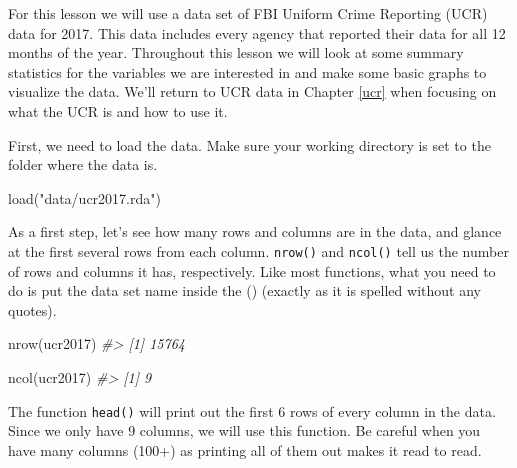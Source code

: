 \documentclass[
  12pt,
]{book}
\newenvironment{Shaded}{\begin{snugshade}}{\end{snugshade}}
\newcommand{\CommentTok}[1]{\textcolor[rgb]{0.37,0.37,0.37}{\textit{#1}}}
\newcommand{\FunctionTok}[1]{\textcolor[rgb]{0,0,0}{#1}}
\newcommand{\NormalTok}[1]{#1}
\newcommand{\StringTok}[1]{\textcolor[rgb]{0.5,0.5,0.5}{#1}}
\begin{document}
For this lesson we will use a data set of FBI Uniform Crime Reporting (UCR) data for 2017. This data includes every agency that reported their data for all 12 months of the year. Throughout this lesson we will look at some summary statistics for the variables we are interested in and make some basic graphs to visualize the data. We'll return to UCR data in Chapter \ref{ucr} when focusing on what the UCR is and how to use it.

First, we need to load the data. Make sure your working directory is set to the folder where the data is.

\begin{Shaded}
\begin{Highlighting}[]
\FunctionTok{load}\NormalTok{(}\StringTok{"data/ucr2017.rda"}\NormalTok{)}
\end{Highlighting}
\end{Shaded}

As a first step, let's see how many rows and columns are in the data, and glance at the first several rows from each column. \texttt{nrow()} and \texttt{ncol()} tell us the number of rows and columns it has, respectively. Like most functions, what you need to do is put the data set name inside the () (exactly as it is spelled without any quotes).

\begin{Shaded}
\begin{Highlighting}[]
\FunctionTok{nrow}\NormalTok{(ucr2017)}
\CommentTok{\#\textgreater{} [1] 15764}
\end{Highlighting}
\end{Shaded}

\begin{Shaded}
\begin{Highlighting}[]
\FunctionTok{ncol}\NormalTok{(ucr2017)}
\CommentTok{\#\textgreater{} [1] 9}
\end{Highlighting}
\end{Shaded}

The function \texttt{head()} will print out the first 6 rows of every column in the data. Since we only have 9 columns, we will use this function. Be careful when you have many columns (100+) as printing all of them out makes it read to read.
\end{document}
